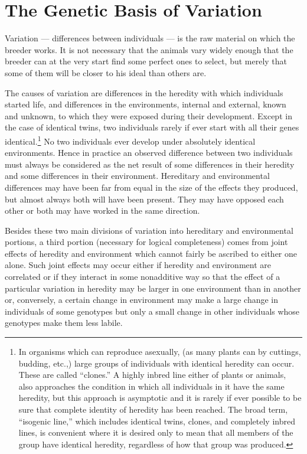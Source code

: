 \chapter{The Genetic Basis of Variation}
\label{cha:genetic-basis-of-variation}

Variation --- differences between individuals --- is the raw material on
which the breeder works. It is not necessary that the animals vary widely
enough that the breeder can at the very start find some perfect ones
to select, but merely that some of them will be closer to his ideal than
others are.

The causes of variation are differences in the heredity with which
individuals started life, and differences in the environments, internal
and external, known and unknown, to which they were exposed during
their development. Except in the case of identical twins, two individuals
rarely if ever start with all their genes identical.\footnote{In organisms
which can reproduce asexually, (as many plants can by cuttings, budding,
etc.,) large groups of individuals with identical heredity can occur. These
are called ``clones.'' A highly inbred line either of plants or animals,
also approaches the condition in which all individuals in it have the same
heredity, but this approach is asymptotic and it is rarely if ever possible
to be sure that complete identity of heredity has been reached. The broad
term, ``isogenic line,'' which includes identical twins, clones, and
completely inbred lines, is convenient where it is desired only to mean that
all members of the group have identical heredity, regardless of how that
group was produced.} No two individuals ever develop under absolutely
identical environments. Hence in practice an observed difference between two
individuals must always be considered as the net result of some differences
in their heredity and some differences in their environment. Hereditary and
environmental differences may have been far from equal in the size of the
effects they produced, but almost always both will have been present. They may
have opposed each other or both may have worked in the same direction.

Besides these two main divisions of variation into hereditary and
environmental portions, a third portion (necessary for logical completeness)
comes from joint effects of heredity and environment which cannot fairly be
ascribed to either one alone. Such joint effects may occur either if heredity
and environment are correlated or if they interact in some nonadditive way so
that the effect of a particular variation in heredity may be larger in one
environment than in another or, conversely, a certain change in environment
may make a large change in individuals of some genotypes but only a small
change in other individuals whose genotypes make them less labile.

